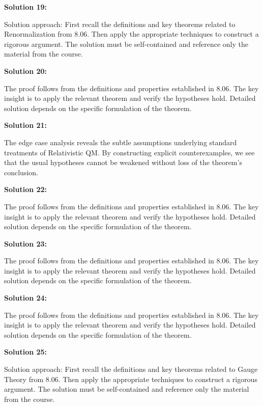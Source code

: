 \documentclass[12pt,a4paper]{exam}
\begin{document}
\textbf{Solution 19:}

Solution approach: First recall the definitions and key theorems related to Renormalization from 8.06. Then apply the appropriate techniques to construct a rigorous argument. The solution must be self-contained and reference only the material from the course.

\vspace{0.5cm}

\textbf{Solution 20:}

The proof follows from the definitions and properties established in 8.06. The key insight is to apply the relevant theorem and verify the hypotheses hold. Detailed solution depends on the specific formulation of the theorem.

\vspace{0.5cm}

\textbf{Solution 21:}

The edge case analysis reveals the subtle assumptions underlying standard treatments of Relativistic QM. By constructing explicit counterexamples, we see that the usual hypotheses cannot be weakened without loss of the theorem's conclusion.

\vspace{0.5cm}

\textbf{Solution 22:}

The proof follows from the definitions and properties established in 8.06. The key insight is to apply the relevant theorem and verify the hypotheses hold. Detailed solution depends on the specific formulation of the theorem.

\vspace{0.5cm}

\textbf{Solution 23:}

The proof follows from the definitions and properties established in 8.06. The key insight is to apply the relevant theorem and verify the hypotheses hold. Detailed solution depends on the specific formulation of the theorem.

\vspace{0.5cm}

\textbf{Solution 24:}

The proof follows from the definitions and properties established in 8.06. The key insight is to apply the relevant theorem and verify the hypotheses hold. Detailed solution depends on the specific formulation of the theorem.

\vspace{0.5cm}

\textbf{Solution 25:}

Solution approach: First recall the definitions and key theorems related to Gauge Theory from 8.06. Then apply the appropriate techniques to construct a rigorous argument. The solution must be self-contained and reference only the material from the course.

\vspace{0.5cm}
\end{document}
